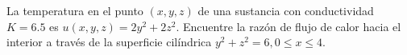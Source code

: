 \item La temperatura en el punto $(x, y, z)$ de una sustancia con conductividad $K = 6.5$ es $u(x, y, z) = 2y^2 + 2z^2$. Encuentre la razón de flujo de calor hacia el interior a través de la superficie cilíndrica $y^2 + z^2 = 6, 0 \le x \le 4$.
